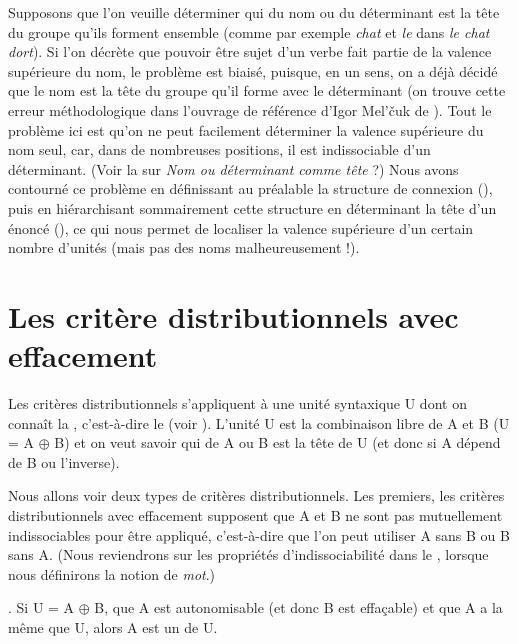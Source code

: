 Supposons que l’on veuille déterminer qui du nom ou du déterminant est la tête du groupe qu’ils forment ensemble (comme par exemple \textit{chat} et \textit{le} dans \textit{le chat dort}). Si l’on décrète que pouvoir être sujet d’un verbe fait partie de la valence supérieure du nom, le problème est biaisé, puisque, en un sens, on a déjà décidé que le nom est la tête du groupe qu’il forme avec le déterminant (on trouve cette erreur méthodologique dans l’ouvrage de référence d’Igor Mel’čuk de \citeyear{melcuk1988dependency}). Tout le problème ici est qu’on ne peut facilement déterminer la valence supérieure du nom seul, car, dans de nombreuses positions, il est indissociable d’un déterminant. (Voir la  sur \textit{Nom ou déterminant comme tête} ?) Nous avons contourné ce problème en définissant au préalable la structure de connexion (), puis en hiérarchisant sommairement cette structure en déterminant la tête d’un énoncé (), ce qui nous permet de localiser la valence supérieure d’un certain nombre d’unités (mais pas des noms malheureusement !).

\section{Les critère distributionnels avec effacement}\label{sec:3.3.11}

Les critères distributionnels s’appliquent à une unité syntaxique U dont on connaît la , c’est-à-dire le  (voir ).
L'unité U est la combinaison libre de A et B (U = A ${\oplus}$ B) et on veut savoir qui de A ou B est la tête de U (et donc si A dépend de B ou l'inverse).

Nous allons voir deux types de critères distributionnels. Les premiers, les critères distributionnels avec effacement supposent que A et B ne sont pas mutuellement indissociables pour être appliqué, c'est-à-dire que l'on peut utiliser A sans B ou B sans A. (Nous reviendrons sur les propriétés d'indissociabilité dans le  , lorsque nous définirons la notion de \textit{mot}.)

{. Si U = A ${\oplus}$ B, que A est autonomisable (et donc B est effaçable) et que A a la même  que U, alors A est un  de U.}

